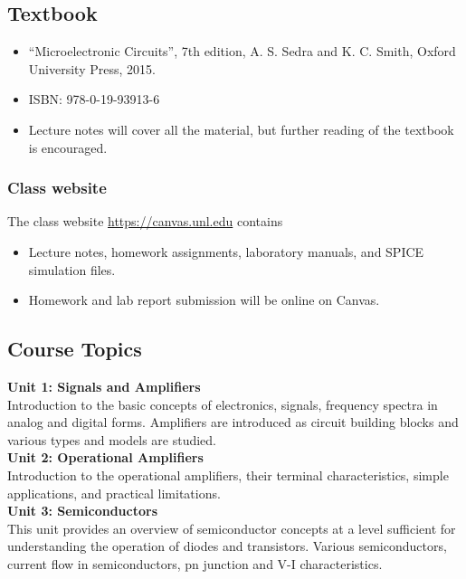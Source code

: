 \documentclass[10pt]{article}
\begin{document}
\subsection*{Textbook}
\begin{itemize}
	\item ``Microelectronic Circuits'', 7th edition, A. S. Sedra and K. C. Smith, Oxford University Press, 2015.
	\item ISBN: 978-0-19-93913-6
	\item Lecture notes will cover all the material, but further reading of the textbook is encouraged. 
\end{itemize}

\subsubsection*{Class website}

The class website \href{https://canvas.unl.edu}{https://canvas.unl.edu} contains

\begin{itemize}
	\item Lecture notes, homework assignments, laboratory manuals, and SPICE simulation files.
	\item Homework and lab report submission will be online on Canvas.
\end{itemize}

\subsection*{Course Topics}

\textbf{Unit 1: Signals and Amplifiers} \\
Introduction to the basic concepts of electronics, signals, frequency spectra in analog and digital forms.  Amplifiers are introduced as circuit building blocks and various types and models are studied. \\

\textbf{Unit 2: Operational Amplifiers } \\
Introduction to the operational amplifiers, their terminal characteristics, simple applications, and practical limitations. \\

\textbf{Unit 3: Semiconductors} \\
This unit provides an overview of semiconductor concepts at a level sufficient for understanding the operation of diodes and transistors. Various semiconductors, current flow in semiconductors, pn junction and V-I characteristics. \\
\end{document}

